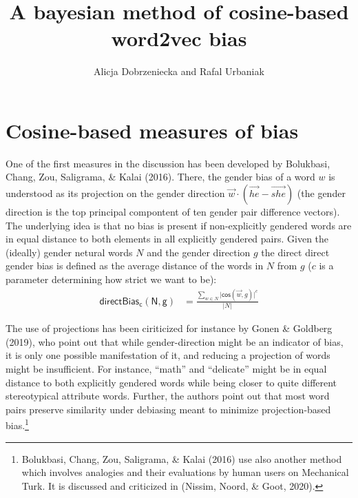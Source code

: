 \documentclass[
  10pt,
  dvipsnames,enabledeprecatedfontcommands]{scrartcl}
\title{A bayesian method of cosine-based word2vec bias}
\author{Alicja Dobrzeniecka and Rafal Urbaniak}
\date{}
\begin{document}
\maketitle

\hypertarget{cosine-based-measures-of-bias}{%
\section{Cosine-based measures of
bias}\label{cosine-based-measures-of-bias}}

One of the first measures in the discussion has been developed by
Bolukbasi, Chang, Zou, Saligrama, \& Kalai (2016). There, the gender
bias of a word \(w\) is understood as its projection on the gender
direction \(\vec{w} \cdot (\overrightarrow{he} - \overrightarrow{she})\)
(the gender direction is the top principal compontent of ten gender pair
difference vectors). The underlying idea is that no bias is present if
non-explicitly gendered words are in equal distance to both elements in
all explicitly gendered pairs. Given the (ideally) gender netural words
\(N\) and the gender direction \(g\) the direct direct gender bias is
defined as the average distance of the words in \(N\) from \(g\) (\(c\)
is a parameter determining how strict we want to be): \begin{align}
\mathsf{directBias_c(N,g)} & = \frac{\sum_{w\in N}\vert \mathsf{cos}(\vec{w},g)\vert^c}{\vert N \vert }
\end{align}

The use of projections has been ciriticized for instance by Gonen \&
Goldberg (2019), who point out that while gender-direction might be an
indicator of bias, it is only one possible manifestation of it, and
reducing a projection of words might be insufficient. For instance,
``math'' and ``delicate'' might be in equal distance to both explicitly
gendered words while being closer to quite different stereotypical
attribute words. Further, the authors point out that most word pairs
preserve similarity under debiasing meant to minimize projection-based
bias.\footnote{Bolukbasi, Chang, Zou, Saligrama, \& Kalai (2016) use
  also another method which involves analogies and their evaluations by
  human users on Mechanical Turk. It is discussed and criticized in
  (Nissim, Noord, \& Goot, 2020).}
\end{document}
